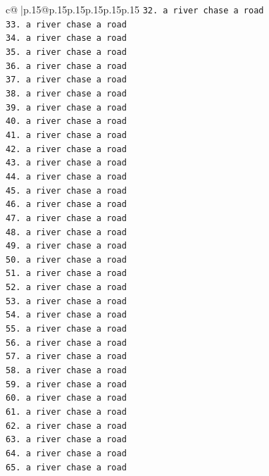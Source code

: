 \documentclass{article}
\begin{document}
{\begin{supertabular}{c@{$\;$}|p{.15\linewidth}@{}p{.15\linewidth}p{.15\linewidth}p{.15\linewidth}p{.15\linewidth}p{.15\linewidth}}
{{{\texttt{32. a river chase a road} \\
\texttt{33. a river chase a road} \\
\texttt{34. a river chase a road} \\
\texttt{35. a river chase a road} \\
\texttt{36. a river chase a road} \\
\texttt{37. a river chase a road} \\
\texttt{38. a river chase a road} \\
\texttt{39. a river chase a road} \\
\texttt{40. a river chase a road} \\
\texttt{41. a river chase a road} \\
\texttt{42. a river chase a road} \\
\texttt{43. a river chase a road} \\
\texttt{44. a river chase a road} \\
\texttt{45. a river chase a road} \\
\texttt{46. a river chase a road} \\
\texttt{47. a river chase a road} \\
\texttt{48. a river chase a road} \\
\texttt{49. a river chase a road} \\
\texttt{50. a river chase a road} \\
\texttt{51. a river chase a road} \\
\texttt{52. a river chase a road} \\
\texttt{53. a river chase a road} \\
\texttt{54. a river chase a road} \\
\texttt{55. a river chase a road} \\
\texttt{56. a river chase a road} \\
\texttt{57. a river chase a road} \\
\texttt{58. a river chase a road} \\
\texttt{59. a river chase a road} \\
\texttt{60. a river chase a road} \\
\texttt{61. a river chase a road} \\
\texttt{62. a river chase a road} \\
\texttt{63. a river chase a road} \\
\texttt{64. a river chase a road} \\
\texttt{65. a river chase a road} \\
}}}
\end{supertabular}}
\end{document}
